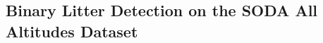 

\subsection{Binary Litter Detection on the SODA All Altitudes Dataset}
\label{subsec:5_soda_tiled_single_dataset_exp}


